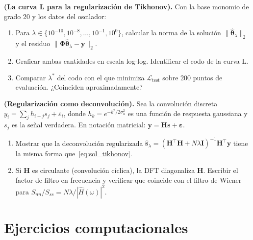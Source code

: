 \begin{ejercicio}
\label{ej:curva_L}
\textbf{(La curva L para la regularización de Tikhonov).}
Con la base monomio de grado 20 y los datos del oscilador:
\begin{enumerate}[label=(\alph*)]
  \item Para $\lambda \in \{10^{-10}, 10^{-8}, \ldots, 10^{-1},
        10^0\}$, calcular la norma de la solución
        $\|\hat{\bm{\theta}}_\lambda\|_2$ y el residuo
        $\|\bm{\Phi}\hat{\bm{\theta}}_\lambda - \bm{y}\|_2$.
  \item Graficar ambas cantidades en escala log-log. Identificar el
        codo de la curva L.
  \item Comparar $\lambda^*$ del codo con el que minimiza
        $\mathcal{L}_{\text{test}}$ sobre 200 puntos de evaluación.
        ¿Coinciden aproximadamente?
\end{enumerate}
\end{ejercicio}

\begin{ejercicio}
\label{ej:tikhonov_nuclear}
\textbf{(Regularización como deconvolución).}
Sea la convolución discreta $y_i = \sum_j h_{i-j} s_j + \varepsilon_i$,
donde $h_k = e^{-k^2/2\sigma_h^2}$ es una función de respuesta
gaussiana y $s_j$ es la señal verdadera. En notación matricial:
$\bm{y} = \bm{H}\bm{s} + \bm{\varepsilon}$.
\begin{enumerate}[label=(\alph*)]
  \item Mostrar que la deconvolución regularizada
        $\hat{\bm{s}}_\lambda = (\bm{H}^\top\bm{H}+N\lambda\bm{I})^{-1}
        \bm{H}^\top\bm{y}$ tiene la misma forma que~\eqref{eq:sol_tikhonov}.
  \item Si $\bm{H}$ es circulante (convolución cíclica), la DFT
        diagonaliza $\bm{H}$. Escribir el factor de filtro en frecuencia
        y verificar que coincide con el filtro de Wiener para
        $S_{nn}/S_{ss} = N\lambda/|\hat{H}(\omega)|^2$.
\end{enumerate}
\end{ejercicio}

\section*{Ejercicios computacionales}

